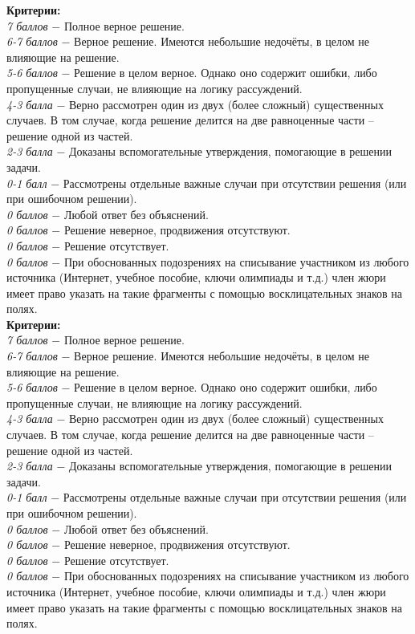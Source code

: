  \textbf{Критерии:} \\
\textit{7 баллов} $-$ Полное верное решение.\\
\textit{6-7 баллов} $-$ Верное решение. Имеются небольшие недочёты, в целом не влияющие на решение.\\
\textit{5-6 баллов} $-$ Решение в целом верное. Однако оно содержит ошибки, либо пропущенные случаи, не влияющие на логику рассуждений.\\
\textit{4-3 балла} $-$ Верно рассмотрен один из двух (более сложный) существенных случаев. В том случае, когда решение делится на две равноценные части – решение одной из частей. 
\\
\textit{2-3 балла} $-$ Доказаны вспомогательные утверждения, помогающие в решении задачи.
\\
\textit{0-1 балл} $-$ Рассмотрены отдельные важные случаи при отсутствии решения (или при ошибочном решении).\\
\textit{0 баллов} $-$ Любой ответ без объяснений.\\
\textit{0 баллов} $-$ Решение неверное, продвижения отсутствуют.\\
\textit{0 баллов} $-$ Решение отсутствует.\\
\textit{0 баллов} $-$ При обоснованных подозрениях на списывание участником из любого источника (Интернет, учебное пособие, ключи олимпиады и т.д.) член жюри имеет право указать на такие фрагменты с помощью восклицательных знаков на полях. \\

 \textbf{Критерии:} \\
\textit{7 баллов} $-$ Полное верное решение.\\
\textit{6-7 баллов} $-$ Верное решение. Имеются небольшие недочёты, в целом не влияющие на решение.\\
\textit{5-6 баллов} $-$ Решение в целом верное. Однако оно содержит ошибки, либо пропущенные случаи, не влияющие на логику рассуждений.\\
\textit{4-3 балла} $-$ Верно рассмотрен один из двух (более сложный) существенных случаев. В том случае, когда решение делится на две равноценные части – решение одной из частей. 
\\
\textit{2-3 балла} $-$ Доказаны вспомогательные утверждения, помогающие в решении задачи.
\\
\textit{0-1 балл} $-$ Рассмотрены отдельные важные случаи при отсутствии решения (или при ошибочном решении).\\
\textit{0 баллов} $-$ Любой ответ без объяснений.\\
\textit{0 баллов} $-$ Решение неверное, продвижения отсутствуют.\\
\textit{0 баллов} $-$ Решение отсутствует.\\
\textit{0 баллов} $-$ При обоснованных подозрениях на списывание участником из любого источника (Интернет, учебное пособие, ключи олимпиады и т.д.) член жюри имеет право указать на такие фрагменты с помощью восклицательных знаков на полях. \\